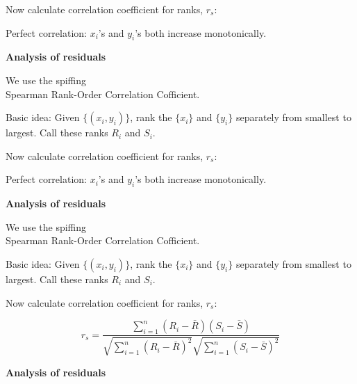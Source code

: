 {\inv 

Now calculate correlation coefficient for ranks, $r_s$:

{\small
{}
}

Perfect correlation: $x_i$'s and $y_i$'s both
increase monotonically.

\vis



  \textbf{Analysis of residuals}

We use the spiffing \\
Spearman Rank-Order Correlation Cofficient.

Basic idea:  Given $\{(x_i,y_i)\}$, rank 
the $\{x_i\}$ and $\{y_i\}$ separately from
smallest to largest.  Call these ranks $R_i$ and $S_i$.

Now calculate correlation coefficient for ranks, $r_s$:

{\small
{}
}

\inv

Perfect correlation: $x_i$'s and $y_i$'s both
increase monotonically.

\vis



  \textbf{Analysis of residuals}

We use the spiffing \\
Spearman Rank-Order Correlation Cofficient.

Basic idea:  Given $\{(x_i,y_i)\}$, rank 
the $\{x_i\}$ and $\{y_i\}$ separately from
smallest to largest.  Call these ranks $R_i$ and $S_i$.

Now calculate correlation coefficient for ranks, $r_s$:

{\small
$$ r_s 
= 
\frac{
  \sum_{i=1}^{n} (R_i - \bar{R})(S_i - \bar{S})
}
{
  \sqrt{\sum_{i=1}^{n} (R_i - \bar{R})^2}
  \sqrt{\sum_{i=1}^{n} (S_i - \bar{S})^2}
}
$$
}


\vis



  \textbf{Analysis of residuals}


}
